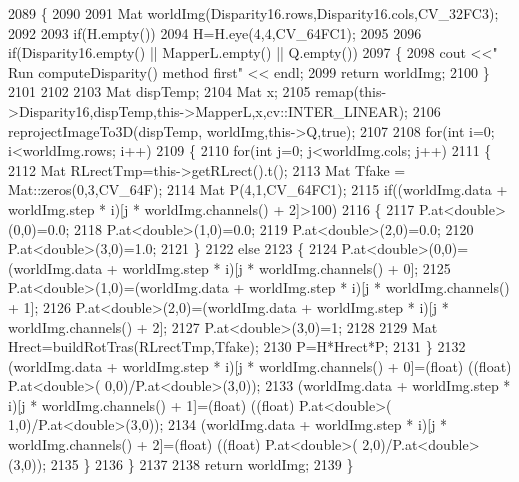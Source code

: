 \begin{DoxyCode}
2089 \{
2090 
2091     Mat worldImg(Disparity16.rows,Disparity16.cols,CV\_32FC3);
2092 
2093     \textcolor{keywordflow}{if}(H.empty())
2094         H=H.eye(4,4,CV\_64FC1);
2095 
2096     \textcolor{keywordflow}{if}(Disparity16.empty() || MapperL.empty() || Q.empty())
2097     \{
2098         cout <<\textcolor{stringliteral}{" Run computeDisparity() method first"} << endl;
2099         \textcolor{keywordflow}{return} worldImg;
2100     \}
2101 
2102 
2103     Mat dispTemp;
2104     Mat x;
2105     remap(this->Disparity16,dispTemp,this->MapperL,x,cv::INTER\_LINEAR);
2106     reprojectImageTo3D(dispTemp, worldImg,this->Q,\textcolor{keyword}{true});
2107 
2108     \textcolor{keywordflow}{for}(\textcolor{keywordtype}{int} i=0; i<worldImg.rows; i++)
2109     \{
2110        \textcolor{keywordflow}{for}(\textcolor{keywordtype}{int} j=0; j<worldImg.cols; j++)
2111         \{   
2112             Mat RLrectTmp=this->getRLrect().t();
2113             Mat Tfake = Mat::zeros(0,3,CV\_64F);
2114             Mat P(4,1,CV\_64FC1);
2115             \textcolor{keywordflow}{if}((worldImg.data + worldImg.step * i)[j * worldImg.channels() + 2]>100)
2116             \{
2117                 P.at<\textcolor{keywordtype}{double}>(0,0)=0.0;
2118                 P.at<\textcolor{keywordtype}{double}>(1,0)=0.0;
2119                 P.at<\textcolor{keywordtype}{double}>(2,0)=0.0;
2120                 P.at<\textcolor{keywordtype}{double}>(3,0)=1.0;
2121             \}
2122             \textcolor{keywordflow}{else}
2123             \{
2124                 P.at<\textcolor{keywordtype}{double}>(0,0)=(worldImg.data + worldImg.step * i)[j * worldImg.channels() + 0];
2125                 P.at<\textcolor{keywordtype}{double}>(1,0)=(worldImg.data + worldImg.step * i)[j * worldImg.channels() + 1];
2126                 P.at<\textcolor{keywordtype}{double}>(2,0)=(worldImg.data + worldImg.step * i)[j * worldImg.channels() + 2];
2127                 P.at<\textcolor{keywordtype}{double}>(3,0)=1;
2128 
2129                 Mat Hrect=buildRotTras(RLrectTmp,Tfake);
2130                 P=H*Hrect*P;
2131             \}
2132             (worldImg.data + worldImg.step * i)[j * worldImg.channels() + 0]=(float) ((\textcolor{keywordtype}{float}) P.at<\textcolor{keywordtype}{double}>(
      0,0)/P.at<\textcolor{keywordtype}{double}>(3,0));
2133             (worldImg.data + worldImg.step * i)[j * worldImg.channels() + 1]=(float) ((\textcolor{keywordtype}{float}) P.at<\textcolor{keywordtype}{double}>(
      1,0)/P.at<\textcolor{keywordtype}{double}>(3,0));
2134             (worldImg.data + worldImg.step * i)[j * worldImg.channels() + 2]=(float) ((\textcolor{keywordtype}{float}) P.at<\textcolor{keywordtype}{double}>(
      2,0)/P.at<\textcolor{keywordtype}{double}>(3,0));
2135         \}
2136     \}
2137     
2138     \textcolor{keywordflow}{return} worldImg;
2139 \}
\end{DoxyCode}
